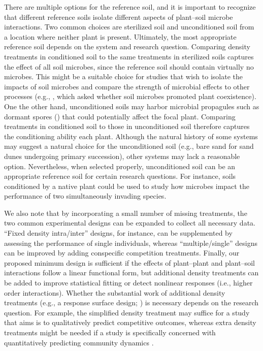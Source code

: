 There are multiple options for the reference soil, and it is important to recognize that different reference soils isolate different aspects of plant--soil microbe interactions. Two common choices are sterilized soil and unconditioned soil from a location where neither plant is present. Ultimately, the most appropriate reference soil depends on the system and research question.
Comparing density treatments in conditioned soil to the same treatments in sterilized soils captures the effect of all soil microbes, since the reference soil should contain virtually no microbes. This might be a suitable choice for studies that wish to isolate the impacts of soil microbes and compare the strength of microbial effects to other processes (e.g., \citealp{Chung2016}, which asked whether soil microbes promoted plant coexistence).
One the other hand, unconditioned soils may harbor microbial propagules such as dormant spores (\citealp{Lennon2011}) that could potentially affect the focal plant. Comparing treatments in conditioned soil to those in unconditioned soil therefore captures the conditioning ability each plant.
Although the natural history of some systems may suggest a natural choice for the unconditioned soil (e.g., bare sand for sand dunes undergoing primary succession), other systems may lack a reasonable option. Nevertheless, when selected properly, unconditioned soil can be an appropriate reference soil for certain research questions. For instance, soils conditioned by a native plant could be used to study how microbes impact the performance of two simultaneously invading species.
\par


We also note that by incorporating a small number of missing treatments, the two common experimental designs can be expanded to collect all necessary data. ``Fixed density intra/inter'' designs, for instance, can be supplemented by assessing the performance of single individuals, whereas ``multiple/single'' designs can be improved by adding conspecific competition treatments.
Finally, our proposed minimum design is sufficient if the effects of plant--plant and plant--soil interactions follow a linear functional form, but additional density treatments can be added to improve statistical fitting or detect nonlinear responses (i.e.,  higher order interactions).
Whether the substantial work of additional density treatments (e.g., a response surface design; \citealp{inouye2001}) is necessary depends on the research question.
For example, the simplified density treatment may suffice for a study that aims is to qualitatively predict competitive outcomes, whereas extra density treatments might be needed if a study is specifically concerned with quantitatively predicting community dynamics \citep{Hart2018, Letten2019}.
\par



